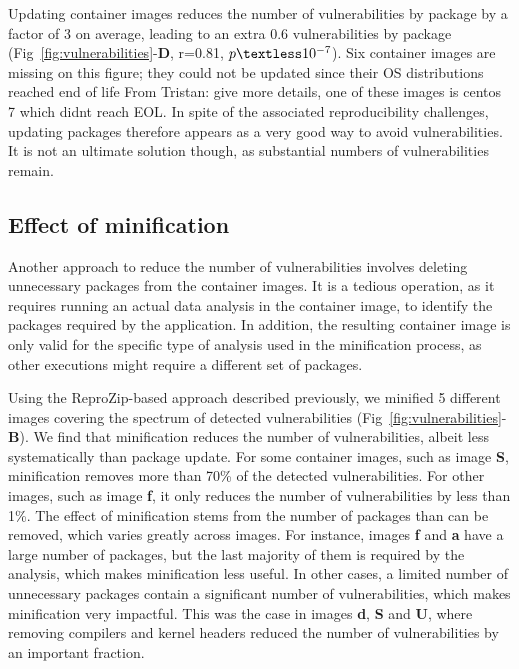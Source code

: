 \documentclass[a4paper,num-refs]{oup-contemporary}
\newcommand{\tristan}[1]{\color{blue}From Tristan: #1\color{black}}
\begin{document}
Updating container images reduces the number of vulnerabilities by package
by a factor of 3 on average, leading to an extra 0.6 vulnerabilities by
package (Fig~\ref{fig:vulnerabilities}-\textbf{D}, r=0.81,
$p\textless10^{-7}$). Six container images are missing on this figure; they
could not be updated since their OS distributions reached end of life
\tristan{give more details, one of these images is centos 7 which didnt
reach EOL}. In spite of the associated reproducibility challenges, updating
packages therefore appears as a very good way to avoid vulnerabilities. It
is not an ultimate solution though, as substantial numbers of
vulnerabilities remain.

\subsection{Effect of minification}

Another approach to reduce the number of vulnerabilities involves deleting
unnecessary packages from the container images. It is a tedious operation,
as it requires running an actual data analysis in the container image, to
identify the packages required by the application. In addition, the
resulting container image is only valid for the specific type of analysis
used in the minification process, as other executions might require a
different set of packages. 

Using the ReproZip-based approach described previously, we minified 5
different images covering the spectrum of detected vulnerabilities
(Fig~\ref{fig:vulnerabilities}-\textbf{B}). We find that minification reduces the
number of vulnerabilities, albeit less systematically than package update.
For some container images, such as image \textbf{S}, minification removes more
than 70\% of the detected vulnerabilities. For other images, such as
image \textbf{f}, it only reduces the number of vulnerabilities by less than 1\%.
The effect of minification stems from the number of packages
than can be removed, which varies greatly across images. For
instance, images \textbf{f} and \textbf{a} have a large number of packages,
but the last majority of them is required by the analysis, which makes
minification less useful. In other cases, a limited number of unnecessary packages contain 
a significant number of vulnerabilities, which makes minification very impactful. 
This was the case in images \textbf{d}, \textbf{S} and \textbf{U}, where removing compilers
and kernel headers reduced the number of vulnerabilities by an important fraction. 
\end{document}
